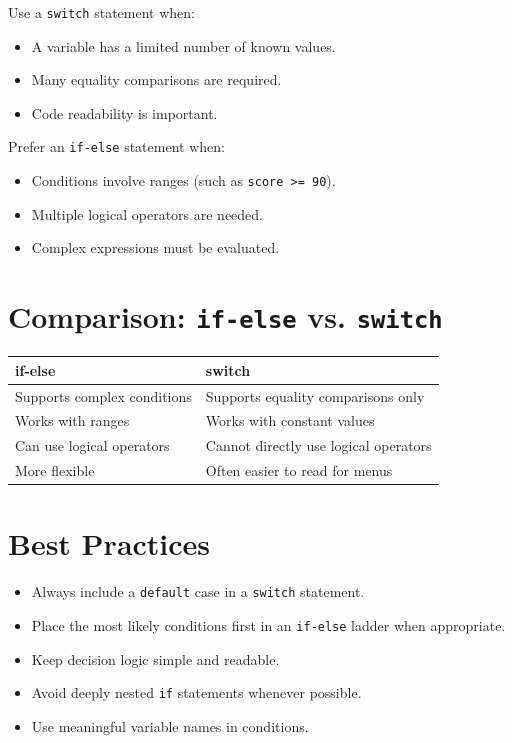 \documentclass[12pt,openany]{book}
\begin{document}
Use a \texttt{switch} statement when:

\begin{itemize}
    \item A variable has a limited number of known values.
    \item Many equality comparisons are required.
    \item Code readability is important.
\end{itemize}

Prefer an \texttt{if-else} statement when:

\begin{itemize}
    \item Conditions involve ranges (such as \texttt{score >= 90}).
    \item Multiple logical operators are needed.
    \item Complex expressions must be evaluated.
\end{itemize}

\section{Comparison: \texttt{if-else} vs. \texttt{switch}}

\begin{center}
\begin{tabular}{|p{5cm}|p{5cm}|}
\hline
\textbf{if-else} & \textbf{switch} \\
\hline
Supports complex conditions & Supports equality comparisons only \\
Works with ranges & Works with constant values \\
Can use logical operators & Cannot directly use logical operators \\
More flexible & Often easier to read for menus \\
\hline
\end{tabular}
\end{center}

\section{Best Practices}

\begin{itemize}
    \item Always include a \texttt{default} case in a \texttt{switch} statement.
    \item Place the most likely conditions first in an \texttt{if-else} ladder when appropriate.
    \item Keep decision logic simple and readable.
    \item Avoid deeply nested \texttt{if} statements whenever possible.
    \item Use meaningful variable names in conditions.
\end{itemize}
\end{document}
